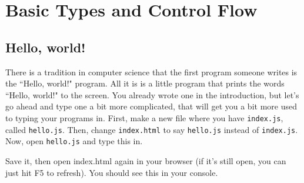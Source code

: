 \chapter{Basic Types and Control Flow}

\section{Hello, world!}

There is a tradition in computer science that the first program someone writes
is the ``Hello, world!" program. All it is is a little program that prints the
words ``Hello, world!" to the screen. You already wrote one in the introduction,
but let's go ahead and type one a bit more complicated, that will get you a bit
more used to typing your programs in. First, make a new file where you have
{\tt index.js}, called {\tt hello.js}. Then, change {\tt index.html} to say
{\tt hello.js} instead of {\tt index.js}. Now, open {\tt hello.js} and type this
in.



Save it, then open index.html again in your browser (if it's still open, you can
just hit F5 to refresh). You should see this in your console.




